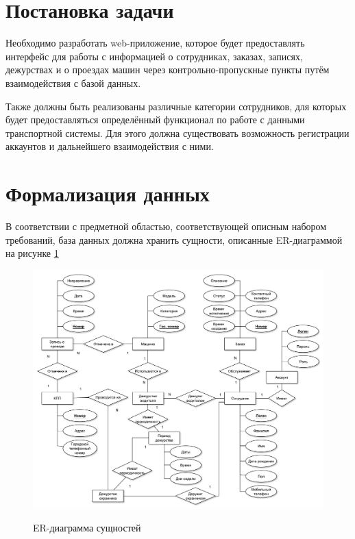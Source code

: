 \section{Постановка задачи}
Необходимо разработать web-приложение, которое будет предоставлять интерфейс для работы с информацией о сотрудниках, заказах, записях, дежурствах и о проездах машин через контрольно-пропускные пункты путём взаимодействия с базой данных.

Также должны быть реализованы различные категории сотрудников, для которых будет предоставляться определённый функционал по работе с данными транспортной системы. Для этого должна существовать возможность регистрации аккаунтов и дальнейшего взаимодействия с ними.

\newpage
\section{Формализация данных}
В соответствии с предметной областью, соответствующей описным набором требований, база данных должна хранить сущности, описанные ER-диаграммой на рисунке \ref{er_analitics}


\begin{figure}[ph!] 
	\begin{center}
		{\includegraphics[scale=0.45]{schemes/er.pdf}}
		\caption{ER-диаграмма сущностей}
		\label{er_analitics}
	\end{center}
\end{figure}

